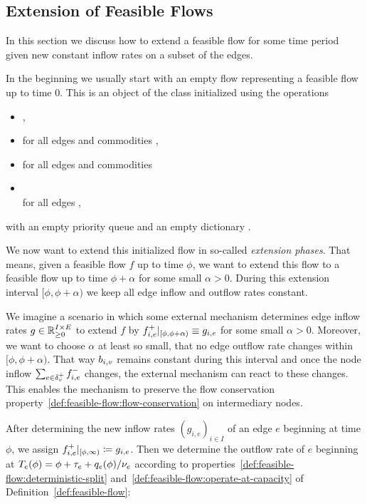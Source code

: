\subsection{Extension of Feasible Flows}

In this section we discuss how to extend a feasible flow for some time period given new constant inflow rates on a subset of the edges.

In the beginning we usually start with an empty flow representing a feasible flow up to time $0$.
This is an object of the class  initialized using the operations
\begin{itemize}
\setlength{\itemsep}{0em}
\item {},
\item {} for all edges  and commodities ,
\item {} for all edges  and commodities 
\item {}\\ for all edges ,
\end{itemize}
with an empty priority queue  and an empty dictionary .

We now want to extend this initialized flow in so-called \emph{extension phases}.
That means, given a feasible flow $f$ up to time $\phi$, we want to extend this flow to a feasible flow up to time $\phi + \alpha$ for some small $\alpha > 0$.
During this extension interval $[\phi, \phi+\alpha)$ we keep all edge inflow and outflow rates constant.

We imagine a scenario in which some external mechanism determines edge inflow rates $g\in\mathbb{R}_{\geq 0}^{I\times E}$ to extend $f$ by ${f}^+_{i,e}\vert_{[\phi, \phi+\alpha)} \equiv g_{i,e}$ for some small $\alpha > 0$.
Moreover, we want to choose $\alpha$ at least so small, that no edge outflow rate changes within $[\phi, \phi + \alpha)$.
That way $b_{i,v}$ remains constant during this interval and once the node inflow $\sum_{e\in\delta^+_{v}}{f}^-_{i,e}$ changes, the external mechanism can react to these changes.
This enables the mechanism to preserve the flow conservation property~\ref{def:feasible-flow:flow-conservation} on intermediary nodes.

After determining the new inflow rates $(g_{i,e})_{i\in I}$ of an edge $e$ beginning at time $\phi$, we assign ${f}^+_{i,e}\vert_{[\phi,\infty)} \coloneqq g_{i,e}$.
Then we determine the outflow rate of $e$ beginning at $T_e(\phi) = \phi + \tau_e + q_e(\phi)/\nu_e$ according to properties~\ref{def:feasible-flow:deterministic-split} and~\ref{def:feasible-flow:operate-at-capacity} of Definition~\ref{def:feasible-flow}:


